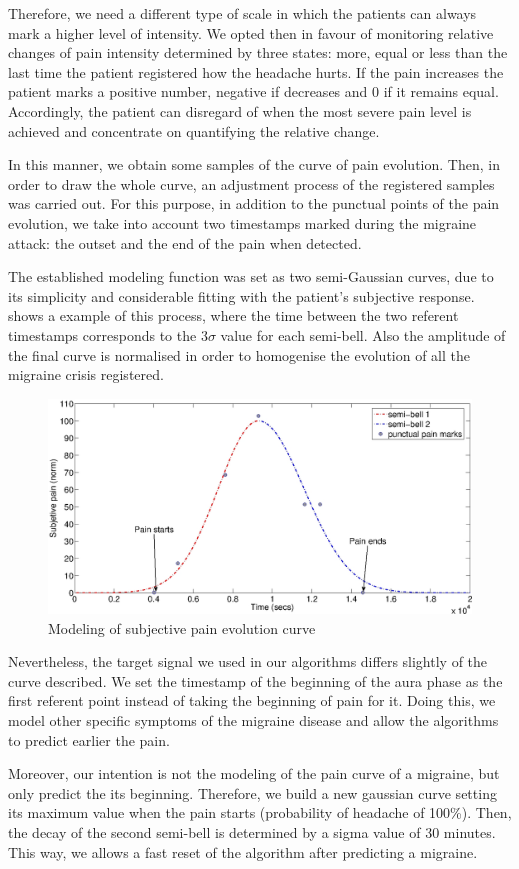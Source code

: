Therefore, we need a different type of scale in which the patients can always mark a higher level of intensity. We opted then in favour of monitoring relative changes of pain intensity determined by three states: more, equal or less than the last time the patient registered how the headache hurts. 
If the pain increases the patient marks a positive number, negative if decreases and 0 if it remains equal. Accordingly, the patient can disregard of when the most severe pain level is achieved and concentrate on quantifying the relative change.

In this manner, we obtain some samples of the curve of pain evolution. 
Then, in order to draw the whole curve, an adjustment process of the registered samples was carried out. 
For this purpose, in addition to the punctual points of the pain evolution, we take into account two timestamps marked during the
migraine attack: the outset and the end of the pain when detected.

The established modeling function was set as two semi-Gaussian curves, due to its simplicity and considerable fitting with the
patient's subjective response.  shows a example of this process, where the time between the two referent timestamps corresponds to the $3\sigma$ value for each semi-bell.
Also the amplitude of the final curve is normalised in order to homogenise the evolution of all the migraine crisis registered. 

\begin{figure}[!ht]
\centering
\includegraphics[width=\textwidth]{images/paincurvereal}
\caption{Modeling of subjective pain evolution curve}
\label{fig:paincurve}
\end{figure}

Nevertheless, the target signal we used in our algorithms differs slightly of the curve described.
We set the timestamp of the beginning of the aura phase as the first referent point instead of taking the beginning of pain for it. Doing this, we model other specific symptoms of the migraine disease and allow the algorithms to predict earlier the pain.

Moreover, our intention is not the modeling of the pain curve of a migraine, but only predict the its beginning. Therefore, we build a new gaussian curve setting its maximum value when the pain starts (probability of headache of 100\%). Then, the decay of the second semi-bell is determined by a sigma value of $30$ minutes. This way, we allows a fast reset of the algorithm after predicting a migraine.

